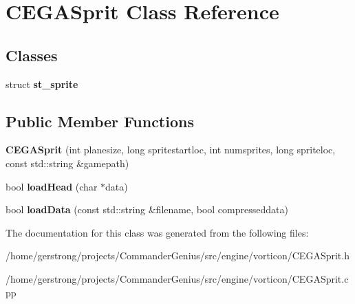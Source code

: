 \hypertarget{class_c_e_g_a_sprit}{
\section{CEGASprit Class Reference}
\label{class_c_e_g_a_sprit}
}
\subsection*{Classes}
\begin{DoxyCompactItemize}
\item 
struct {\bfseries st\_\-sprite}
\end{DoxyCompactItemize}
\subsection*{Public Member Functions}
\begin{DoxyCompactItemize}
\item 
\hypertarget{class_c_e_g_a_sprit_a1a539409be471db9db5ca1819e881414}{
{\bfseries CEGASprit} (int planesize, long spritestartloc, int numsprites, long spriteloc, const std::string \&gamepath)}
\label{class_c_e_g_a_sprit_a1a539409be471db9db5ca1819e881414}

\item 
\hypertarget{class_c_e_g_a_sprit_a2dd36d02ed9e2d98f4e4c8e6932f4218}{
bool {\bfseries loadHead} (char $\ast$data)}
\label{class_c_e_g_a_sprit_a2dd36d02ed9e2d98f4e4c8e6932f4218}

\item 
\hypertarget{class_c_e_g_a_sprit_af48f7153b0e6b5209b9e6e80263a541b}{
bool {\bfseries loadData} (const std::string \&filename, bool compresseddata)}
\label{class_c_e_g_a_sprit_af48f7153b0e6b5209b9e6e80263a541b}

\end{DoxyCompactItemize}


The documentation for this class was generated from the following files:\begin{DoxyCompactItemize}
\item 
/home/gerstrong/projects/CommanderGenius/src/engine/vorticon/CEGASprit.h\item 
/home/gerstrong/projects/CommanderGenius/src/engine/vorticon/CEGASprit.cpp\end{DoxyCompactItemize}
